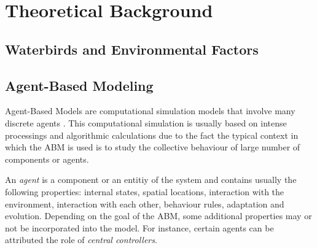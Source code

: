 %
%
%
%


\section{Theoretical Background}

\subsection{Waterbirds and Environmental Factors}

\subsection{Agent-Based Modeling}
Agent-Based Models are computational simulation models that involve many discrete agents \cite{ago2019abm}. This computational simulation is usually based on intense processings and algorithmic calculations due to the fact the typical context in which the ABM is used is to study the collective behaviour of large number of components or agents.

An \emph{agent} is a component or an entitiy of the system and contains usually the following properties: internal states, spatial locations, interaction with the environment, interaction with each other, behaviour rules, adaptation and evolution. Depending on the goal of the ABM, some additional properties may or not be incorporated into the model. For instance, certain agents can be attributed the role of \emph{central controllers}.

